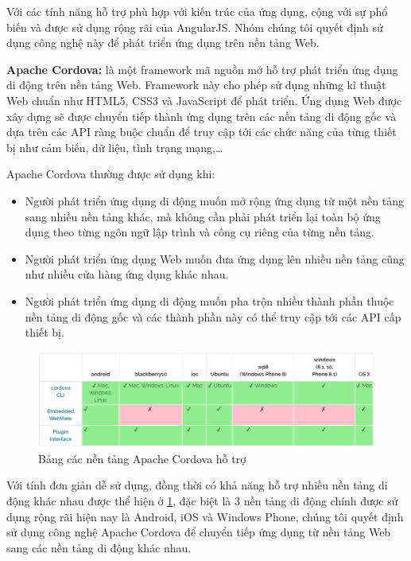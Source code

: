 \documentclass[12pt,a4paper,oneside]{extbook}
\begin{document}
Với các tính năng hỗ trợ phù hợp với kiến trúc của ứng dụng, cộng với sự phổ biến và được sử dụng rộng rãi của AngularJS. Nhóm chúng tôi quyết định sử dụng công nghệ này để phát triển ứng dụng trên nền tảng Web.

\textbf{Apache Cordova:} là một framework mã nguồn mở hỗ trợ phát triển ứng dụng di động trên nền tảng Web. Framework này cho phép sử dụng những kĩ thuật Web chuẩn như HTML5, CSS3 và JavaScript để phát triển. Ứng dụng Web được xây dựng sẽ được chuyển tiếp thành ứng dụng trên các nền tảng di động gốc và dựa trên các API ràng buộc chuẩn để truy cập tới các chức năng của từng thiết bị như cảm biến, dữ liệu, tình trạng mạng,\dots

Apache Cordova thường được sử dụng khi:

\begin{itemize}[topsep=1mm,itemsep=-0.5mm]
\item Người phát triển ứng dụng di động muốn mở rộng ứng dụng từ một nền tảng sang nhiều nền tảng khác, mà không cần phải phát triển lại toàn bộ ứng dụng theo từng ngôn ngữ lập trình và công cụ riêng của từng nền tảng.
\item Người phát triển ứng dụng Web muốn đưa ứng dụng lên nhiều nền tảng cũng như nhiều cửa hàng ứng dụng khác nhau.
\item Người phát triển ứng dụng di động muốn pha trộn nhiều thành phần thuộc nền tảng di động gốc và các thành phần này có thể  truy cập tới các API cấp thiết bị.
\vspace{1mm}
\end{itemize}

\begin{figure}[h]
  \centering
     \includegraphics[width=15cm]{6-cordova-platforms}
  \caption{Bảng các nền tảng Apache Cordova hỗ trợ}\label{fig:6-cordova-platforms}
\end{figure}

Với tính đơn giản dễ sử dụng, đồng thời có khả năng hỗ trợ nhiều nền tảng di động khác nhau được thể hiện ở \ref{fig:6-cordova-platforms}, đặc biệt là 3 nền tảng di động chính được sử dụng rộng rãi hiện nay là Android, iOS và Windows Phone, chúng tôi quyết định sử dụng công nghệ Apache Cordova để chuyển tiếp ứng dụng từ nền tảng Web sang các nền tảng di động khác nhau.
\end{document}
